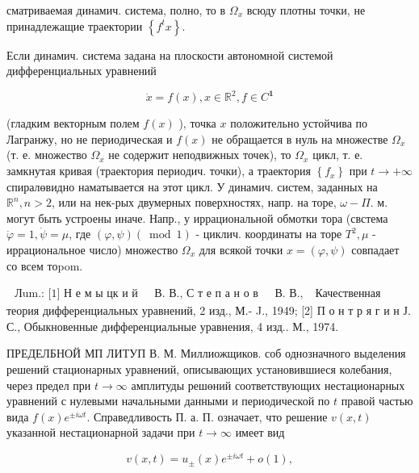 \documentclass[10pt]{article}
\begin{document}
сматриваемая динамич. система, полно, то в $\Omega_{x}$ всюду плотны точки, не принадлежащие траектории $\left\{f^{t} x\right\}$.



Если динамич. система задана на плоскости автономной системой дифференциальных уравнений



\[

\dot{x}=f(x), x \in \mathbb{R}^{2}, f \in C^{\mathbf{1}}

\]



(гладким векторным полем $f(x)$ ), точка $x$ положительно устойчива по Лагранжу, но не периодическая и $f(x)$ не обращается в нуль на множестве $\Omega_{x}$ (т. е. множество $\Omega_{x}$ не содержит неподвижных точек), то $\Omega_{x}$ цикл, т. е. замкнутая кривая (траектория периодич. точки), а траектория $\left\{f_{x}\right\}$ при $t \rightarrow+\infty$ спиралөвидно наматывается на этот цикл. У динамич. систем, заданных на $\mathbb{R}^{n}, n>2$, или на нек-рых двумерных поверхностях, напр. на торе, $\omega-\Pi$. м. могут быть устроены иначе. Напр., у иррациональной обмотки тора (свстема $\dot{\varphi}=1, \dot{\psi}=\mu$, где $(\varphi, \psi)(\bmod 1)$ - циклич. координаты на торе $T^{2}, \mu$ - иррациональное число) множество $\Omega_{x}$ для всякой точки $x=(\varphi, \psi)$ совпадает со всем тоpom.



$\begin{array}{lllll}\text { Лum.: [1] Н е м ы цк и й } & \text { В. В., С т е п а н о в } & \text { В. В., }\end{array}$ Качественная теория дифференциальных уравнений, 2 изд., М.- J., 1949; [2] П о н т р я г и н Ј. С., Обыкновенные дифференциальные уравнения, 4 изд.. М., 1974.



ПРЕДЕЛБНОЙ МП ЛИТУП В. М. Миллиожщиков. соб однозначного выделения решений стационарных уравнений, описывающих установившиеся колебания, через предел при $t \rightarrow \infty$ амплитуды решөний соответствующих нестационарных уравнений с нулевыми начальными данными и периодической по $t$ правой частью вида $f(x) e^{ \pm i \omega t}$. Справедливость П. а. П. означает, что решение $v(x, t)$ указанной нестационарной задачи при $t \rightarrow \infty$ имеет вид



\[

v(x, t)=u_{ \pm}(x) e^{ \pm i \omega t}+o(1),

\]
\end{document}
